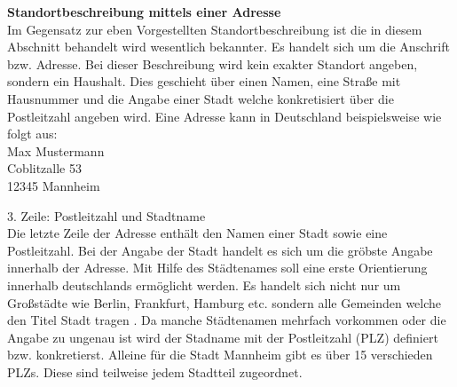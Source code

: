 \textbf{Standortbeschreibung mittels einer Adresse}
\\Im Gegensatz zur eben Vorgestellten Standortbeschreibung ist die in diesem Abschnitt behandelt wird wesentlich bekannter. Es handelt sich um die Anschrift bzw. Adresse. Bei dieser Beschreibung wird kein exakter Standort angeben, sondern ein Haushalt. Dies geschieht über einen Namen, eine Straße mit Hausnummer und die Angabe einer Stadt welche konkretisiert über die Postleitzahl angeben wird.  
Eine Adresse kann in Deutschland beispielsweise wie folgt aus:
\\Max Mustermann 
\\Coblitzalle 53
\\12345 Mannheim


3. Zeile: Postleitzahl und Stadtname
\\Die letzte Zeile der Adresse enthält den Namen einer Stadt sowie eine Postleitzahl. Bei der Angabe der Stadt handelt es sich um die gröbste Angabe innerhalb der Adresse. Mit Hilfe des Städtenames soll eine erste Orientierung innerhalb deutschlands ermöglicht werden. Es handelt sich nicht nur um Großstädte wie Berlin, Frankfurt, Hamburg etc. sondern alle Gemeinden welche den Titel Stadt tragen .
Da manche Städtenamen mehrfach vorkommen oder die Angabe zu ungenau ist wird der Stadname mit der Postleitzahl (PLZ) definiert bzw. konkretierst. Alleine für die Stadt Mannheim gibt es über 15 verschieden PLZs. Diese sind teilweise jedem Stadtteil zugeordnet.

